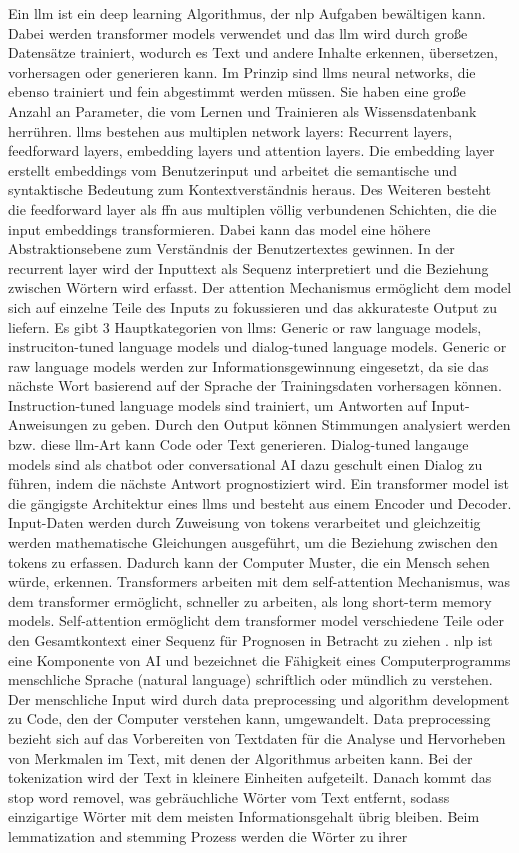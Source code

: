 Ein \gls{llm} ist ein deep learning Algorithmus, der \gls{nlp} Aufgaben bewältigen kann. Dabei werden transformer models verwendet und das \gls{llm} wird durch große Datensätze trainiert, wodurch es Text und andere Inhalte erkennen, übersetzen, vorhersagen oder generieren kann. Im Prinzip sind \gls{llm}s neural networks, die ebenso trainiert und fein abgestimmt werden müssen. Sie haben eine große Anzahl an Parameter, die vom Lernen und Trainieren als Wissensdatenbank herrühren. \gls{llm}s bestehen aus multiplen network layers: Recurrent layers, feedforward layers, embedding layers und attention layers. Die embedding layer erstellt embeddings vom Benutzerinput und arbeitet die semantische und syntaktische Bedeutung zum Kontextverständnis heraus. Des Weiteren besteht die feedforward layer als \gls{ffn} aus multiplen völlig verbundenen Schichten, die die input embeddings transformieren. Dabei kann das model eine höhere Abstraktionsebene zum Verständnis der Benutzertextes gewinnen. In der recurrent layer wird der Inputtext als Sequenz interpretiert und die Beziehung zwischen Wörtern wird erfasst. Der attention Mechanismus ermöglicht dem model sich auf einzelne Teile des Inputs zu fokussieren und das akkurateste Output zu liefern. Es gibt 3 Hauptkategorien von \gls{llm}s: Generic or raw language models, instruciton-tuned language models und dialog-tuned language models. Generic or raw language models werden zur Informationsgewinnung eingesetzt, da sie das nächste Wort basierend auf der Sprache der Trainingsdaten vorhersagen können. Instruction-tuned language models sind trainiert, um Antworten auf Input-Anweisungen zu geben. Durch den Output können Stimmungen analysiert werden bzw. diese \gls{llm}-Art kann Code oder Text generieren. Dialog-tuned langauge models sind als chatbot oder conversational AI dazu geschult einen Dialog zu führen, indem die nächste Antwort prognostiziert wird. Ein transformer model ist die gängigste Architektur eines \gls{llm}s und besteht aus einem Encoder und Decoder. Input-Daten werden durch Zuweisung von tokens verarbeitet und gleichzeitig werden mathematische Gleichungen ausgeführt, um die Beziehung zwischen den tokens zu erfassen. Dadurch kann der Computer Muster, die ein Mensch sehen würde, erkennen. Transformers arbeiten mit dem self-attention Mechanismus, was dem transformer ermöglicht, schneller zu arbeiten, als long short-term memory models. Self-attention ermöglicht dem transformer model verschiedene Teile oder den Gesamtkontext einer Sequenz für Prognosen in Betracht zu ziehen \cite{llm-def}. \gls{nlp} ist eine Komponente von AI und bezeichnet die Fähigkeit eines Computerprogramms menschliche Sprache (natural language) schriftlich oder mündlich zu verstehen. Der menschliche Input wird durch data preprocessing und algorithm development zu Code, den der Computer verstehen kann, umgewandelt. Data preprocessing bezieht sich auf das Vorbereiten von Textdaten für die Analyse und Hervorheben von Merkmalen im Text, mit denen der Algorithmus arbeiten kann. Bei der tokenization wird der Text in kleinere Einheiten aufgeteilt. Danach kommt das stop word removel, was gebräuchliche Wörter vom Text entfernt, sodass einzigartige Wörter mit dem meisten Informationsgehalt übrig bleiben. Beim lemmatization and stemming Prozess werden die Wörter zu ihrer 